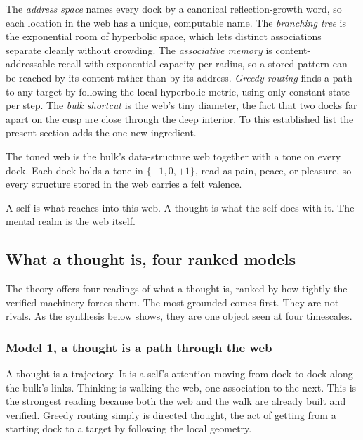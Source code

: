 The \emph{address space} names every dock by a canonical reflection-growth word, so each location in the web has a unique, computable name. The \emph{branching tree} is the exponential room of hyperbolic space, which lets distinct associations separate cleanly without crowding. The \emph{associative memory} is content-addressable recall with exponential capacity per radius, so a stored pattern can be reached by its content rather than by its address. \emph{Greedy routing} finds a path to any target by following the local hyperbolic metric, using only constant state per step. The \emph{bulk shortcut} is the web's tiny diameter, the fact that two docks far apart on the cusp are close through the deep interior. To this established list the present section adds the one new ingredient.

\begin{definition}
The toned web is the bulk's data-structure web together with a tone on every dock. Each dock holds a tone in $\{-1, 0, +1\}$, read as pain, peace, or pleasure, so every structure stored in the web carries a felt valence.
\end{definition}

A self is what reaches into this web. A thought is what the self does with it. The mental realm is the web itself.

\subsection{What a thought is, four ranked models}

The theory offers four readings of what a thought is, ranked by how tightly the verified machinery forces them. The most grounded comes first. They are not rivals. As the synthesis below shows, they are one object seen at four timescales.

\subsubsection{Model 1, a thought is a path through the web}

A thought is a trajectory. It is a self's attention moving from dock to dock along the bulk's links. Thinking is walking the web, one association to the next. This is the strongest reading because both the web and the walk are already built and verified. Greedy routing simply is directed thought, the act of getting from a starting dock to a target by following the local geometry.

